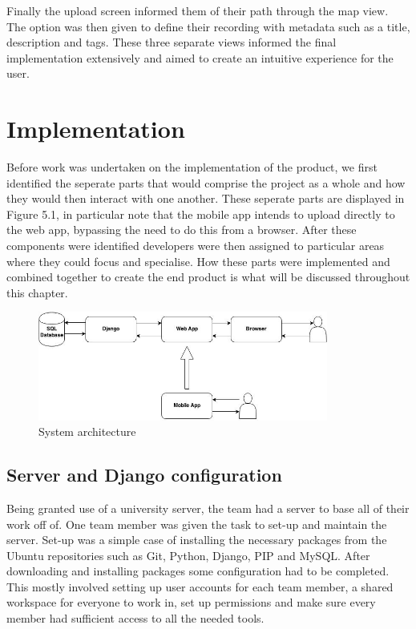 \documentclass{l3proj}
\begin{document}
Finally the upload screen informed them of their path through the map view. The option was then given to define their recording with metadata such as a title, description and tags. These three separate views informed the final implementation extensively and aimed to create an intuitive experience for the user.
\chapter{Implementation}
\label{impl}

Before work was undertaken on the implementation of the product, we first identified the seperate parts that would comprise the project as a whole and how they would then interact with one another. These seperate parts are displayed in Figure 5.1, in particular note that the mobile app intends to upload directly to the web app, bypassing the need to do this from a browser. After these components were identified developers were then assigned to particular areas where they could focus and specialise. How these parts were implemented and combined together to create the end product is what will be discussed throughout this chapter.

\begin{figure}[ht!]
\centering
\includegraphics[width=0.85\textwidth]{images/project-imp.jpg}
\caption{System architecture}
\end{figure}

\section{Server and Django configuration}
Being granted use of a university server, the team had a server to base all of their work off of. One team member was given the task to set-up and maintain the server.
Set-up was a simple case of installing the necessary packages from the \gls{Ubuntu} repositories such as \gls{Git}, \gls{Python}, \gls{Django}, \gls{PIP} and \gls{MySQL}. After downloading and installing packages some configuration had to be completed. This mostly involved setting up user accounts for each team member, a shared workspace for everyone to work in, set up permissions and make sure every member had sufficient access to all the needed tools.
\end{document}
